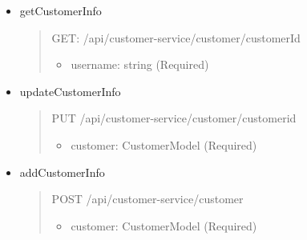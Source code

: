 \begin{itemize}
	\item getCustomerInfo
	\begin{quote}
		GET: /api/customer-service/customer/{customerId}
		\begin{itemize}
			\item username: string (Required)
		\end{itemize}
	\end{quote}

	\item updateCustomerInfo
	\begin{quote}
		PUT /api/customer-service/customer/{customerid}
		\begin{itemize}
			\item customer: CustomerModel (Required)
		\end{itemize}
	\end{quote}

	\item addCustomerInfo
	\begin{quote}
		POST /api/customer-service/customer
		\begin{itemize}
			\item customer: CustomerModel (Required)
		\end{itemize}
	\end{quote}
\end{itemize}

